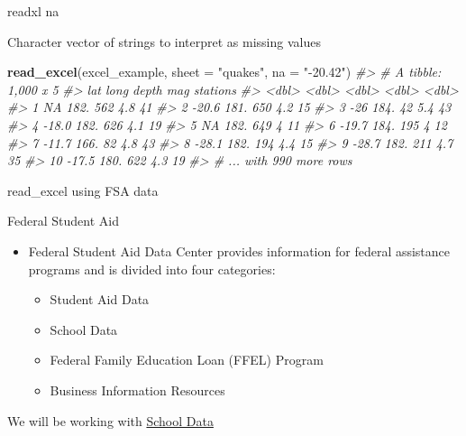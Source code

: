 \documentclass[8pt,ignorenonframetext,dvipsnames]{beamer}
\newenvironment{Shaded}{\begin{snugshade}}{\end{snugshade}}
\newcommand{\KeywordTok}[1]{\textcolor[rgb]{0.13,0.29,0.53}{\textbf{#1}}}
\newcommand{\DataTypeTok}[1]{\textcolor[rgb]{0.13,0.29,0.53}{#1}}
\newcommand{\StringTok}[1]{\textcolor[rgb]{0.31,0.60,0.02}{#1}}
\newcommand{\CommentTok}[1]{\textcolor[rgb]{0.56,0.35,0.01}{\textit{#1}}}
\newcommand{\NormalTok}[1]{#1}
\providecommand{\tightlist}{%
  \setlength{\itemsep}{0pt}\setlength{\parskip}{0pt}}
\renewcommand{\textbf}[1]{{\color{darkgray}\bfseries\fontfamily{Montserrat-TOsF}#1}}
\let\olditem\item
\renewcommand{\item}{%
  \olditem\vspace{4pt}
}
\begin{document}
\begin{frame}[fragile]{readxl na}

Character vector of strings to interpret as missing values

\begin{Shaded}
\begin{Highlighting}[]
\KeywordTok{read_excel}\NormalTok{(excel_example, }\DataTypeTok{sheet =} \StringTok{"quakes"}\NormalTok{, }\DataTypeTok{na =} \StringTok{"-20.42"}\NormalTok{)}
\CommentTok{#> # A tibble: 1,000 x 5}
\CommentTok{#>      lat  long depth   mag stations}
\CommentTok{#>    <dbl> <dbl> <dbl> <dbl>    <dbl>}
\CommentTok{#>  1  NA    182.   562   4.8       41}
\CommentTok{#>  2 -20.6  181.   650   4.2       15}
\CommentTok{#>  3 -26    184.    42   5.4       43}
\CommentTok{#>  4 -18.0  182.   626   4.1       19}
\CommentTok{#>  5  NA    182.   649   4         11}
\CommentTok{#>  6 -19.7  184.   195   4         12}
\CommentTok{#>  7 -11.7  166.    82   4.8       43}
\CommentTok{#>  8 -28.1  182.   194   4.4       15}
\CommentTok{#>  9 -28.7  182.   211   4.7       35}
\CommentTok{#> 10 -17.5  180.   622   4.3       19}
\CommentTok{#> # ... with 990 more rows}
\end{Highlighting}
\end{Shaded}

\end{frame}

\begin{frame}{read\_excel using FSA data}

Federal Student Aid

\begin{itemize}
\tightlist
\item
  Federal Student Aid Data Center provides information for federal
  assistance programs and is divided into four categories:

  \begin{itemize}
  \tightlist
  \item
    Student Aid Data\\
  \item
    School Data\\
  \item
    Federal Family Education Loan (FFEL) Program\\
  \item
    Business Information Resources
  \end{itemize}
\end{itemize}

We will be working with
\href{https://studentaid.ed.gov/sa/node/105}{School Data}

\end{frame}
\end{document}
